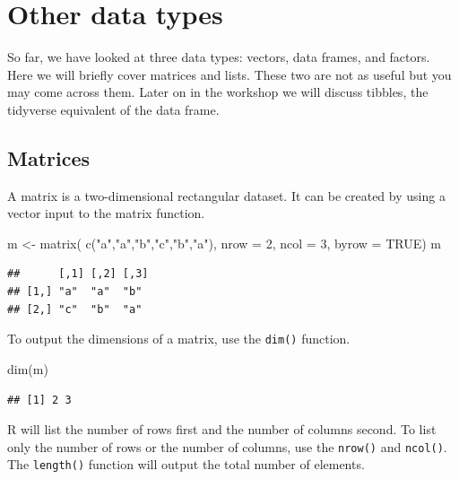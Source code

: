 \documentclass[
]{book}
\newenvironment{Shaded}{\begin{snugshade}}{\end{snugshade}}
\newcommand{\AttributeTok}[1]{\textcolor[rgb]{0.77,0.63,0.00}{#1}}
\newcommand{\ConstantTok}[1]{\textcolor[rgb]{0.00,0.00,0.00}{#1}}
\newcommand{\DecValTok}[1]{\textcolor[rgb]{0.00,0.00,0.81}{#1}}
\newcommand{\FunctionTok}[1]{\textcolor[rgb]{0.00,0.00,0.00}{#1}}
\newcommand{\NormalTok}[1]{#1}
\newcommand{\OtherTok}[1]{\textcolor[rgb]{0.56,0.35,0.01}{#1}}
\newcommand{\StringTok}[1]{\textcolor[rgb]{0.31,0.60,0.02}{#1}}
\begin{document}
\hypertarget{other-data-types}{%
\section{Other data types}\label{other-data-types}}

So far, we have looked at three data types: vectors, data frames, and factors. Here we will briefly cover matrices and lists. These two are not as useful but you may come across them. Later on in the workshop we will discuss tibbles, the tidyverse equivalent of the data frame.

\hypertarget{matrices}{%
\subsection*{Matrices}\label{matrices}}

A matrix is a two-dimensional rectangular dataset. It can be created by using a vector input to the matrix function.

\begin{Shaded}
\begin{Highlighting}[]
\NormalTok{m }\OtherTok{\textless{}{-}} \FunctionTok{matrix}\NormalTok{( }\FunctionTok{c}\NormalTok{(}\StringTok{"a"}\NormalTok{,}\StringTok{"a"}\NormalTok{,}\StringTok{"b"}\NormalTok{,}\StringTok{"c"}\NormalTok{,}\StringTok{"b"}\NormalTok{,}\StringTok{"a"}\NormalTok{), }\AttributeTok{nrow =} \DecValTok{2}\NormalTok{, }\AttributeTok{ncol =} \DecValTok{3}\NormalTok{, }\AttributeTok{byrow =} \ConstantTok{TRUE}\NormalTok{)}
\NormalTok{m}
\end{Highlighting}
\end{Shaded}

\begin{verbatim}
##      [,1] [,2] [,3]
## [1,] "a"  "a"  "b" 
## [2,] "c"  "b"  "a"
\end{verbatim}

To output the dimensions of a matrix, use the \texttt{dim()} function.

\begin{Shaded}
\begin{Highlighting}[]
\FunctionTok{dim}\NormalTok{(m) }
\end{Highlighting}
\end{Shaded}

\begin{verbatim}
## [1] 2 3
\end{verbatim}

R will list the number of rows first and the number of columns second. To list only the number of rows or the number of columns, use the \texttt{nrow()} and \texttt{ncol()}. The \texttt{length()} function will output the total number of elements.
\end{document}
